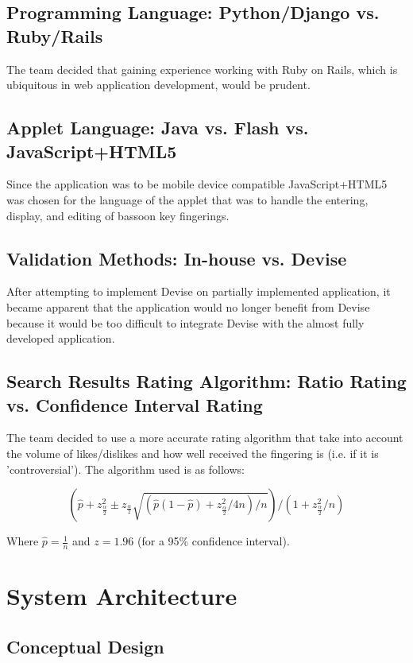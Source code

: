 \documentclass[12pt,english]{article}
\begin{document}
\subsection{Programming Language: Python/Django vs. Ruby/Rails}

The team decided that gaining experience working with Ruby on Rails,
which is ubiquitous in web application development, would be prudent.


\subsection{Applet Language: Java vs. Flash vs. JavaScript+HTML5}

Since the application was to be mobile device compatible JavaScript+HTML5
was chosen for the language of the applet that was to handle the entering,
display, and editing of bassoon key fingerings.


\subsection{Validation Methods: In-house vs. Devise}

After attempting to implement Devise on partially implemented application,
it became apparent that the application would no longer benefit from
Devise because it would be too difficult to integrate Devise with
the almost fully developed application. 


\subsection{Search Results Rating Algorithm: Ratio Rating vs. Confidence Interval
Rating}

The team decided to use a more accurate rating algorithm that take
into account the volume of likes/dislikes and how well received the
fingering is (i.e. if it is 'controversial'). The algorithm used is
as follows:

\[
(\hat{p}+z_{\frac{\alpha}{2}}^{2}\pm z_{\frac{\alpha}{2}}\sqrt{(\hat{p}(1-\hat{p})+z_{\frac{\alpha}{2}}^{2}/4n)/n})/(1+z_{\frac{\alpha}{2}}^{2}/n)
\]


Where $\hat{p}=\frac{1}{n}$ and $z=1.96$ (for a 95\% confidence
interval).


\section{System Architecture}


\subsection{Conceptual Design}
\end{document}
